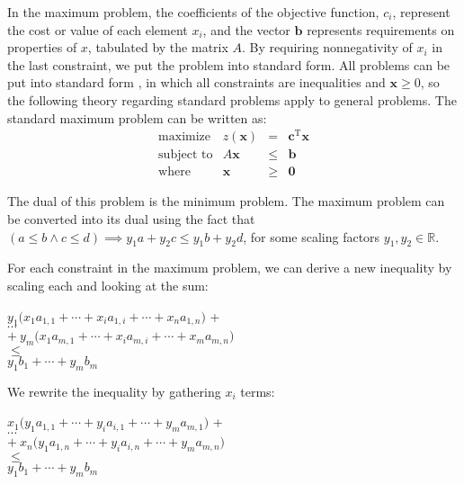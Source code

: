 \documentclass[12pt]{article}
\begin{document}
In the maximum problem, the coefficients of the objective function, $c_i$, represent the cost or value of each element $x_i$, and the vector $\mathbf{b}$ represents requirements on properties of $x$, tabulated by the matrix $A$. By requiring nonnegativity of $x_i$ in the last constraint, we put the problem into standard form. All problems can be put into standard form \cite{ferguson}, in which all constraints are inequalities and $\mathbf{x}\geq0$, so the following theory regarding standard problems apply to general problems. The standard maximum problem can be written as:
\begin{equation} \label{eq:maxprob}
    \begin{array}{rrcl}
        \text{maximize} & z(\mathbf{x}) & = & \mathbf{c}^\text{T} \mathbf{x} \\
        \text{subject\ to} & A \mathbf{x} & \leq & \mathbf{b} \\
        \text{where} & \mathbf{x} & \geq & \mathbf{0}
    \end{array}
\end{equation}

The dual of this problem is the minimum problem. The maximum problem can be converted into its dual using the fact that $(a \leq b \land c \leq d) \implies y_1a+y_2c \leq y_1b+y_2d$, for some scaling factors $y_1, y_2 \in \mathbb{R}$. 

For each constraint in the maximum problem, we can derive a new inequality by scaling each and looking at the sum:

\begin{center}
    $y_1\big(x_1a_{1,1} +  \cdots + x_ia_{1,i} + \cdots +  x_na_{1,n}\big)$ + \\
    $\cdots$ \\
    $+ \ y_m\big( x_1a_{m,1} + \cdots + x_ia_{m,i} + \cdots +  x_ma_{m,n} \big) $\\
    $ \leq$ \\
    $ y_1b_1  + \cdots +  y_mb_m$ 
\end{center} 

We rewrite the inequality by gathering $x_i$ terms:

\begin{center}
    $x_1 \big(y_1a_{1,1} +  \cdots + y_ia_{i,1} + \cdots +  y_ma_{m,1}\big)$ + \\
    $\cdots$ \\
    $+ \ x_n\big(y_1a_{1,n} + \cdots + y_ia_{i,n} + \cdots +  y_ma_{m,n} \big) $\\
    $ \leq$ \\
    $ y_1b_1  + \cdots +  y_mb_m$ 
\end{center} 
\end{document}
